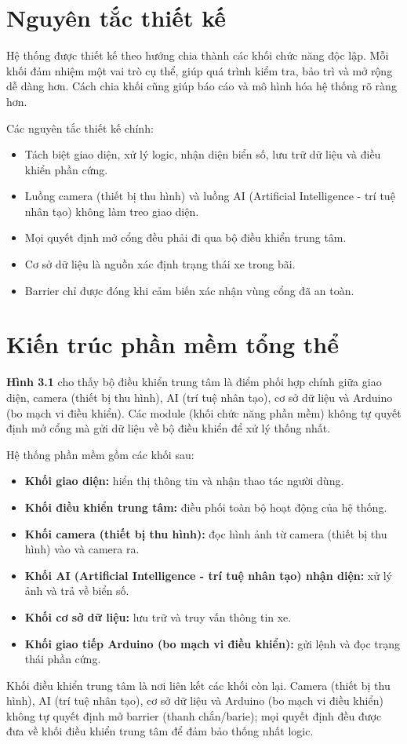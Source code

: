 \documentclass[a4paper,14pt]{extreport}
\begin{document}
\section{Nguyên tắc thiết kế}

Hệ thống được thiết kế theo hướng chia thành các khối chức năng độc lập. Mỗi khối đảm nhiệm một vai trò cụ thể, giúp quá trình kiểm tra, bảo trì và mở rộng dễ dàng hơn. Cách chia khối cũng giúp báo cáo và mô hình hóa hệ thống rõ ràng hơn.

Các nguyên tắc thiết kế chính:

\begin{itemize}[leftmargin=2em]
  \item Tách biệt giao diện, xử lý logic, nhận diện biển số, lưu trữ dữ liệu và điều khiển phần cứng.
  \item Luồng camera (thiết bị thu hình) và luồng AI (Artificial Intelligence - trí tuệ nhân tạo) không làm treo giao diện.
  \item Mọi quyết định mở cổng đều phải đi qua bộ điều khiển trung tâm.
  \item Cơ sở dữ liệu là nguồn xác định trạng thái xe trong bãi.
  \item Barrier chỉ được đóng khi cảm biến xác nhận vùng cổng đã an toàn.
\end{itemize}

\section{Kiến trúc phần mềm tổng thể}

\textbf{Hình 3.1} cho thấy bộ điều khiển trung tâm là điểm phối hợp chính giữa giao diện, camera (thiết bị thu hình), AI (trí tuệ nhân tạo), cơ sở dữ liệu và Arduino (bo mạch vi điều khiển). Các module (khối chức năng phần mềm) không tự quyết định mở cổng mà gửi dữ liệu về bộ điều khiển để xử lý thống nhất.

Hệ thống phần mềm gồm các khối sau:

\begin{itemize}[leftmargin=2em]
  \item \textbf{Khối giao diện:} hiển thị thông tin và nhận thao tác người dùng.
  \item \textbf{Khối điều khiển trung tâm:} điều phối toàn bộ hoạt động của hệ thống.
  \item \textbf{Khối camera (thiết bị thu hình):} đọc hình ảnh từ camera (thiết bị thu hình) vào và camera ra.
  \item \textbf{Khối AI (Artificial Intelligence - trí tuệ nhân tạo) nhận diện:} xử lý ảnh và trả về biển số.
  \item \textbf{Khối cơ sở dữ liệu:} lưu trữ và truy vấn thông tin xe.
  \item \textbf{Khối giao tiếp Arduino (bo mạch vi điều khiển):} gửi lệnh và đọc trạng thái phần cứng.
\end{itemize}
Khối điều khiển trung tâm là nơi liên kết các khối còn lại. Camera (thiết bị thu hình), AI (trí tuệ nhân tạo), cơ sở dữ liệu và Arduino (bo mạch vi điều khiển) không tự quyết định mở barrier (thanh chắn/barie); mọi quyết định đều được đưa về khối điều khiển trung tâm để đảm bảo thống nhất logic.
\end{document}

